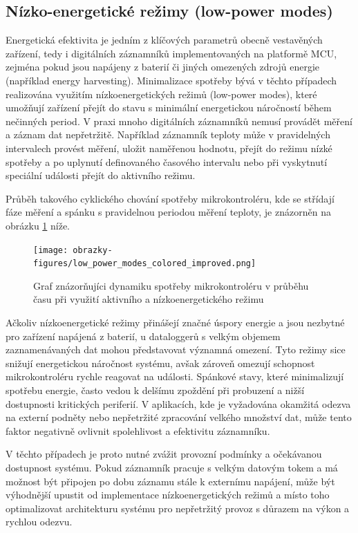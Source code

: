\subsection{Nízko-energetické režimy (low-power modes)}
\label{nizko_energeticke_rezimy}
Energetická efektivita je jedním z klíčových parametrů obecně vestavěných zařízení, tedy i digitálních záznamníků implementovaných na platformě MCU, zejména pokud jsou napájeny z baterií či jiných omezených zdrojů energie (například energy harvesting). Minimalizace spotřeby bývá v těchto případech realizována využitím nízkoenergetických režimů (low-power modes), které umožňují zařízení přejít do stavu s minimální energetickou náročností během nečinných period. V praxi mnoho digitálních záznamníků nemusí provádět měření a záznam dat nepřetržitě. Například záznamník teploty může v pravidelných intervalech provést měření, uložit naměřenou hodnotu, přejít do režimu nízké spotřeby a po uplynutí definovaného časového intervalu nebo při vyskytnutí speciální události přejít do aktivního režimu. \cite{analog_devices_low_power_modes}

Průběh takového cyklického chování spotřeby mikrokontroléru, kde se střídají fáze měření a spánku s pravidelnou periodou měření teploty, je znázorněn na obrázku \ref{fig:low-power-modes} níže.

\begin{figure}[h]
    \centering
    \texttt{[image: obrazky-figures/low\_power\_modes\_colored\_improved.png]}
    
    \caption{Graf znázorňujíci dynamiku spotřeby mikrokontroléru v průběhu času při využití aktivního a nízkoenergetického režimu}
    \label{fig:low-power-modes}
\end{figure}

Ačkoliv nízkoenergetické režimy přinášejí značné úspory energie a jsou nezbytné pro zařízení napájená z baterií, u dataloggerů s velkým objemem zaznamenávaných dat mohou představovat významná omezení. Tyto režimy sice snižují energetickou náročnost systému, avšak zároveň omezují schopnost mikrokontroléru rychle reagovat na události. Spánkové stavy, které minimalizují spotřebu energie, často vedou k delšímu zpoždění při probuzení a nižší dostupnosti kritických periferií. V aplikacích, kde je vyžadována okamžitá odezva na externí podněty nebo nepřetržité zpracování velkého množství dat, může tento faktor negativně ovlivnit spolehlivost a efektivitu záznamníku. \cite{embedded_low_power_modes}

V těchto případech je proto nutné zvážit provozní podmínky a očekávanou dostupnost systému. Pokud záznamník pracuje s velkým datovým tokem a má možnost být připojen po dobu záznamu stále k externímu napájení, může být výhodnější upustit od implementace nízkoenergetických režimů a místo toho optimalizovat architekturu systému pro nepřetržitý provoz s důrazem na výkon a rychlou odezvu. \cite{analog_devices_low_power_modes}


